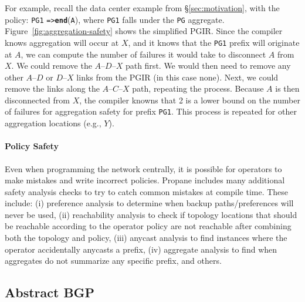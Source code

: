 \documentclass[10pt]{sigalternate052015}
\newcommand{\sysname}{{\small \sf Propane}\xspace}
\newcommand{\para}[1]{\paragraph*{\textbf{#1}}}
\newcommand{\CD}[1]{\texttt{\small #1}}  %
\newcommand{\KW}[1]{\texttt{\small\bfseries{#1}}}
\newcommand{\Path}{\texttt{=>}}
\newcommand{\End}{\KW{end}}
\begin{document}
For example, recall the data center example from \S\ref{sec:motivation}, with the policy: 
\CD{PG1} \Path \text{ }\End(\CD{A}), where \CD{PG1} falls under the \CD{PG} aggregate. Figure~\ref{fig:aggregation-safety} shows the simplified PGIR. Since the compiler knows aggregation will occur at $X$, and it knows that the \CD{PG1} prefix will originate at $A$, we can compute the number of failures it would take to disconnect $A$ from $X$. We could remove the $A$--$D$--$X$ path first. We would then need to remove any other $A$--$D$ or $D$--$X$ links from the PGIR (in this case none). Next, we could remove the links along the $A$--$C$--$X$ path, repeating the process. Because $A$ is then disconnected from $X$, the compiler knowns that 2 is a lower bound on the number of failures for aggregation safety for prefix \CD{PG1}. This process is repeated for other aggregation locations (e.g., $Y$).



\para{Policy Safety}

Even when programming the network centrally, it is possible for operators to make mistakes and write incorrect policies.
\sysname includes many additional safety analysis checks to try to catch common mistakes at compile time. These include: (i) preference analysis to determine when backup paths/preferences will never be used, (ii) reachability analysis to check if topology locations that should be reachable according to the operator policy are not reachable after combining both the topology and policy, (iii) anycast analysis to find instances where the operator accidentally anycasts a prefix, (iv) aggregate analysis to find when aggregates do not summarize any specific prefix, and others.


\subsection{Abstract BGP}
\label{sec:abgp}



\newcommand{\highlight}[1]{%
  \colorbox{red!50}{$\displaystyle#1$}}
\newcommand{\Router}[1]{\KW{Router} #1:}
\newcommand{\REGEX}[1]{\texttt{regex}(#1)}
\newcommand{\PEER}{\texttt{peer}}
\newcommand{\COMM}{\texttt{comm}}
\newcommand{\MED}{\texttt{MED}}
\newcommand{\Arrow}{\ensuremath{\leftarrow}}
\end{document}
